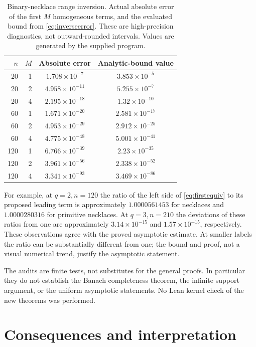 \documentclass[11pt,a4paper]{article}
\numberwithin{equation}{section}
\theoremstyle{definition}
\theoremstyle{remark}
\begin{document}
\begin{table}[htbp]
\centering
\caption{Binary-necklace range inversion. Actual absolute error of the
first $M$ homogeneous terms, and the evaluated bound from
\eqref{eq:inverseerror}. These are high-precision diagnostics, not
outward-rounded intervals. Values are generated by the supplied program.}
\label{tab:errors}
\begin{tabular}{@{}rrcc@{}}
\toprule
$n$&$M$&Absolute error&Analytic-bound value\\
\midrule
20 & 1 & $1.708\times10^{-7}$ & $3.853\times10^{-5}$ \\
20 & 2 & $4.958\times10^{-11}$ & $5.255\times10^{-7}$ \\
20 & 4 & $2.195\times10^{-18}$ & $1.32\times10^{-10}$ \\
60 & 1 & $1.671\times10^{-20}$ & $2.581\times10^{-17}$ \\
60 & 2 & $4.953\times10^{-29}$ & $2.912\times10^{-25}$ \\
60 & 4 & $4.775\times10^{-48}$ & $5.001\times10^{-41}$ \\
120 & 1 & $6.766\times10^{-39}$ & $2.23\times10^{-35}$ \\
120 & 2 & $3.961\times10^{-56}$ & $2.338\times10^{-52}$ \\
120 & 4 & $3.341\times10^{-93}$ & $3.469\times10^{-86}$ \\
\bottomrule
\end{tabular}
\end{table}

For example, at $q=2,n=120$ the ratio of the left side of
\eqref{eq:firstequiv} to its proposed leading term is approximately
$1.0000561453$ for necklaces and $1.0000280316$ for primitive necklaces.
At $q=3,n=210$ the deviations of these ratios from one are approximately
$3.14\times10^{-15}$ and $1.57\times10^{-15}$, respectively.
These observations agree with the proved asymptotic estimate. At smaller
labels the ratio can be substantially different from one; the bound and
proof, not a visual numerical trend, justify the asymptotic statement.

The audits are finite tests, not substitutes for the general proofs.
In particular they do not establish the Banach completeness theorem,
the infinite support argument, or the uniform asymptotic statements.
No Lean kernel check of the new theorems was performed.

\section{Consequences and interpretation}\label{sec:consequences}
\end{document}
